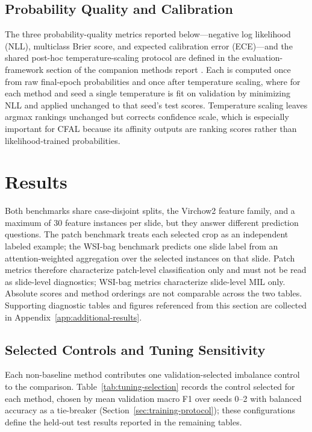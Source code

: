 \documentclass[11pt]{article}
\begin{document}
\subsection{Probability Quality and Calibration}
\label{sec:evaluation-calibration}
The three probability-quality metrics reported below---negative log likelihood (NLL), multiclass Brier score, and expected calibration error (ECE)---and the shared post-hoc temperature-scaling protocol are defined in the evaluation-framework section of the companion methods report \citep{queisler2026imbalanceMethods}. Each is computed once from raw final-epoch probabilities and once after temperature scaling, where for each method and seed a single temperature is fit on validation by minimizing NLL and applied unchanged to that seed's test scores. Temperature scaling leaves argmax rankings unchanged but corrects confidence scale, which is especially important for CFAL because its affinity outputs are ranking scores rather than likelihood-trained probabilities.


\section{Results}
Both benchmarks share case-disjoint splits, the Virchow2 feature family, and a maximum of 30 feature instances per slide, but they answer different prediction questions. The patch benchmark treats each selected crop as an independent labeled example; the WSI-bag benchmark predicts one slide label from an attention-weighted aggregation over the selected instances on that slide. Patch metrics therefore characterize patch-level classification only and must not be read as slide-level diagnostics; WSI-bag metrics characterize slide-level MIL only. Absolute scores and method orderings are not comparable across the two tables.
Supporting diagnostic tables and figures referenced from this section are collected in Appendix~\ref{app:additional-results}.

\subsection{Selected Controls and Tuning Sensitivity}
\label{sec:results-tuning}
Each non-baseline method contributes one validation-selected imbalance control to the comparison. Table~\ref{tab:tuning-selection} records the control selected for each method, chosen by mean validation macro F1 over seeds 0--2 with balanced accuracy as a tie-breaker (Section~\ref{sec:training-protocol}); these configurations define the held-out test results reported in the remaining tables.
\end{document}

